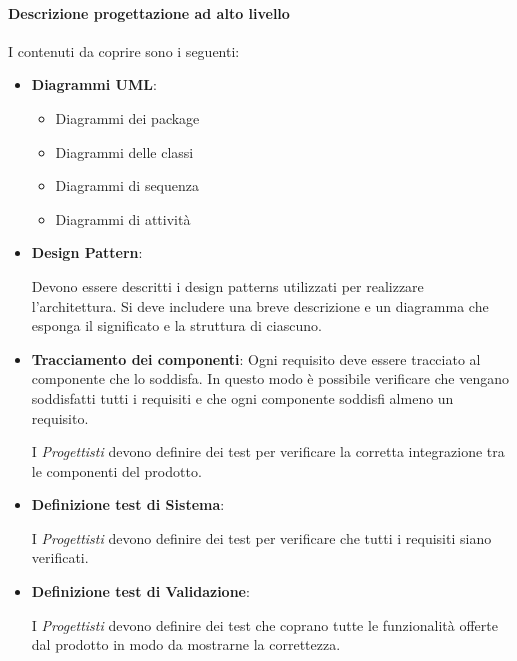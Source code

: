 \paragraph{Descrizione progettazione ad alto livello}

I contenuti da coprire sono i seguenti:

\begin{itemize}
\item \textbf{Diagrammi UML}:
  \begin{itemize}
  \item Diagrammi dei package
  \item Diagrammi delle classi
  \item Diagrammi di sequenza
  \item Diagrammi di attività
  \end{itemize}
\item \textbf{Design Pattern}:

  Devono essere descritti i design patterns utilizzati per realizzare
  l'architettura. Si deve includere una breve descrizione e un
  diagramma che esponga il significato e la struttura di ciascuno. 

\item \textbf{Tracciamento dei componenti}:
  Ogni requisito deve essere tracciato al componente che lo
  soddisfa. In questo modo è possibile verificare che vengano
  soddisfatti tutti i requisiti e che ogni componente soddisfi almeno
  un requisito.  



I \textit{Progettisti} devono definire dei test per verificare la corretta integrazione tra le componenti del prodotto.

\item \textbf{Definizione test di Sistema}:

I \textit{Progettisti} devono definire dei test per verificare che tutti i requisiti siano verificati.

\item \textbf{Definizione test di Validazione}:

I \textit{Progettisti} devono definire dei test che coprano tutte le funzionalità offerte dal prodotto in modo da mostrarne la correttezza.





\end{itemize}


